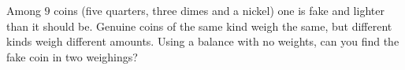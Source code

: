 Among $9$ coins (five quarters, three dimes and a nickel) one is fake and lighter than it should be. Genuine coins of the same kind weigh the same, but different kinds weigh different amounts. Using a balance with no weights, can you find the fake coin in two weighings?
